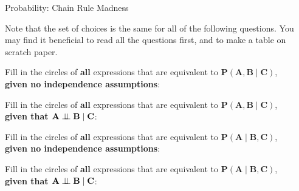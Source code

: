 \begin{problem}[]{Probability: Chain Rule Madness}

Note that the set of choices is the same for all of the following questions.
You may find it beneficial to read all the questions first, and to make a table on scratch paper.

\vspace{.2in}

\begin{question}[3]
Fill in the circles of \textbf{all} expressions that are equivalent to $\mathbf{P(A, B \mid C)}$,\\
\textbf{given no independence assumptions}:

\begin{multicols}{2}
\begin{itemize}[itemsep=6pt]
\OneA
\end{itemize}
\end{multicols}
\end{question}

\vspace{.2in}
\begin{question}[3]
Fill in the circles of \textbf{all} expressions that are equivalent to $\mathbf{P(A, B \mid C)}$,\\
\textbf{given that $\mathbf{A \perp\!\!\!\perp B \mid C}$}:

\begin{multicols}{2}
\begin{itemize}[itemsep=6pt]
\OneB
\end{itemize}
\end{multicols}
\end{question}

\vspace{.2in}

\begin{question}[3]
Fill in the circles of \textbf{all} expressions that are equivalent to $\mathbf{P(A \mid B, C)}$,\\
\textbf{given no independence assumptions}:

\begin{multicols}{2}
\begin{itemize}[itemsep=6pt]
\OneC
\end{itemize}
\end{multicols}
\end{question}

\vspace{.2in}

\begin{question}[3]
Fill in the circles of \textbf{all} expressions that are equivalent to $\mathbf{P(A \mid B, C)}$,\\
\textbf{given that $\mathbf{A \perp\!\!\!\perp B \mid C}$}:

\begin{multicols}{2}
\begin{itemize}[itemsep=6pt]
\OneD
\end{itemize}
\end{multicols}
\end{question}


\end{problem}
